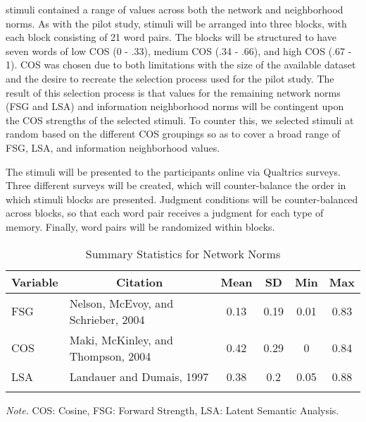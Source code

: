 \documentclass[english,man]{apa6}
\theoremstyle{definition}
\theoremstyle{definition}
\theoremstyle{remark}
\begin{document}
stimuli contained a range of values across both the network and
neighborhood norms. As with the pilot study, stimuli will be arranged
into three blocks, with each block consisting of 21 word pairs. The
blocks will be structured to have seven words of low COS (0 - .33),
medium COS (.34 - .66), and high COS (.67 - 1). COS was chosen due to
both limitations with the size of the available dataset and the desire
to recreate the selection process used for the pilot study. The result
of this selection process is that values for the remaining network norms
(FSG and LSA) and information neighborhood norms will be contingent upon
the COS strengths of the selected stimuli. To counter this, we selected
stimuli at random based on the different COS groupings so as to cover a
broad range of FSG, LSA, and information neighborhood values.

The stimuli will be presented to the participants online via Qualtrics
surveys. Three different surveys will be created, which will
counter-balance the order in which stimuli blocks are presented.
Judgment conditions will be counter-balanced across blocks, so that each
word pair receives a judgment for each type of memory. Finally, word
pairs will be randomized within blocks.

\begin{table}[tbp]
\begin{center}
\begin{threeparttable}
\caption{\label{tab:stim-table}Summary Statistics for Network Norms}
\begin{tabular}{llcccc}
\toprule
Variable & \multicolumn{1}{c}{Citation} & \multicolumn{1}{c}{Mean} & \multicolumn{1}{c}{SD} & \multicolumn{1}{c}{Min} & \multicolumn{1}{c}{Max}\\
\midrule
FSG & Nelson, McEvoy, and Schrieber, 2004 & 0.13 & 0.19 & 0.01 & 0.83\\
COS & Maki, McKinley, and Thompson, 2004 & 0.42 & 0.29 & 0 & 0.84\\
LSA & Landauer and Dumais, 1997 & 0.38 & 0.2 & 0.05 & 0.88\\
\bottomrule
\addlinespace
\end{tabular}
\begin{tablenotes}[para]
\textit{Note.} COS: Cosine, FSG: Forward Strength, LSA: Latent Semantic Analysis.
\end{tablenotes}
\end{threeparttable}
\end{center}
\end{table}
\end{document}
